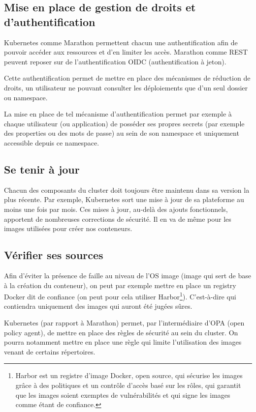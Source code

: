 \documentclass[11pt,fleqn]{book} %
\begin{document}
\subsection*{Mise en place de gestion de droits et d'authentification}
Kubernetes comme Marathon permettent chacun une authentification afin de pouvoir accéder aux ressources et d'en limiter les accès. Marathon comme REST peuvent reposer sur de l'authentification OIDC (authentification à jeton). \newline

Cette authentification permet de mettre en place des mécanismes de réduction de droits, un utilisateur ne pouvant consulter les déploiements que d'un seul dossier ou namespace.\newline

La mise en place de tel mécanisme d'authentification permet par exemple à chaque utilisateur (ou application) de posséder ses propres secrets (par exemple des properties ou des mots de passe) au sein de son namespace et uniquement accessible depuis ce namespace.


\subsection*{Se tenir à jour}
Chacun des composants du cluster doit toujours être maintenu dans sa version la plus récente. Par exemple, Kubernetes sort une mise à jour de sa plateforme au moins une fois par mois. Ces mises à jour, au-delà des ajouts fonctionnels, apportent de nombreuses corrections de sécurité. Il en va de même pour les images utilisées pour créer nos conteneurs.

\subsection*{Vérifier ses sources}
Afin d'éviter la présence de faille au niveau de l'OS image (image qui sert de base à la création du conteneur), on peut par exemple mettre en place un registry Docker dit de confiance (on peut pour cela utiliser Harbor\footnote{Harbor est un registre d'image Docker, open source, qui sécurise les images grâce à des politiques et un contrôle d'accès basé sur les rôles, qui garantit que les images soient exemptes de vulnérabilités et qui signe les images comme étant de confiance.}). C'est-à-dire qui contiendra uniquement des images qui auront été jugées sûres.\newline

Kubernetes (par rapport à Marathon) permet, par l'intermédiaire d'OPA (open policy agent), de mettre en place des règles de sécurité au sein du cluster. On pourra notamment mettre en place une règle qui limite l'utilisation des images venant de certains répertoires.
\end{document}
